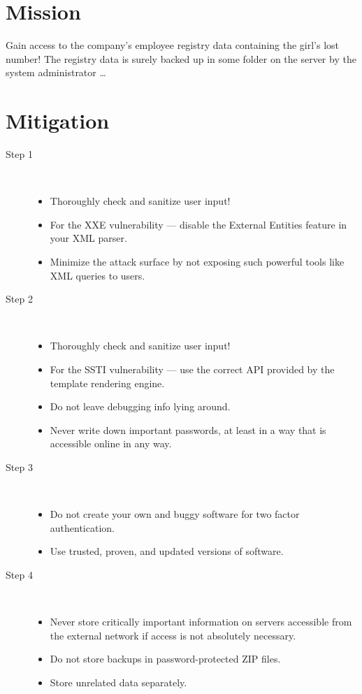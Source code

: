 \documentclass[11pt, a4paper]{article}
\begin{document}
\section{Mission}

Gain access to the company's employee registry data containing the
girl's lost number! The registry data is surely backed up in some folder on the server by the system administrator \ldots

\section{Mitigation}

\begin{description}
  \item[Step 1]~
  \begin{itemize}
	\item Thoroughly check and sanitize user input!
	\item For the XXE vulnerability --- disable the External Entities feature in your XML parser.
	\item Minimize the attack surface by not exposing such powerful tools like XML queries
        to users.
  \end{itemize}        
        
  \item[Step 2]~
	\begin{itemize}
	\item Thoroughly check and sanitize user input!
	\item For the SSTI vulnerability --- use the correct API provided by the template rendering engine.
	\item Do not leave debugging info lying around. 
    \item Never write down important passwords,
        at least in a way that is accessible online in any way.
	\end{itemize}
	
  \item[Step 3]~
  \begin{itemize}
  	\item Do not create your own and buggy software for two factor authentication.
  	\item Use trusted, proven, and updated versions of software.
  \end{itemize}    
        
  \item[Step 4]~
	\begin{itemize}
	\item Never store critically important information on servers accessible from the
        external network if access is not absolutely necessary.
     \item Do not store backups in password-protected ZIP files.
     \item Store unrelated data separately.
     \end{itemize}	  
\end{description}
\end{document}
